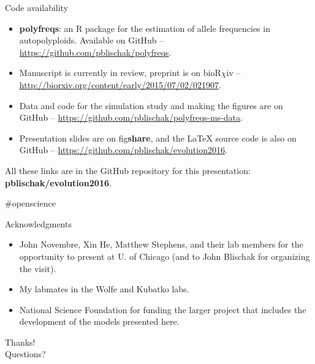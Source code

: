 \documentclass[presentation,sansserif]{beamer}
\begin{document}
\begin{frame}[t,plain]{Code availability}
	\fontsize{10pt}{10}\selectfont
	\begin{itemize}
		\item \textbf{polyfreqs}: an R package for the estimation of allele frequencies in autopolyploids. Available on GitHub -- \url{https://github.com/pblischak/polyfreqs}.
		\vspace{0.2in}

		\item Manuscript is currently in review, preprint is on bioR$\chi$iv -- \url{http://biorxiv.org/content/early/2015/07/02/021907}.
		\vspace{0.2in}

		\item Data and code for the simulation study and making the figures are on GitHub -- \url{https://github.com/pblischak/polyfreqs-ms-data}.
		\vspace{0.2in}

		\item Presentation slides are on fig\textbf{share}, and the \LaTeX{} source code is also on GitHub -- \url{https://github.com/pblischak/evolution2016}.
	\end{itemize}
	\vspace{0.15in}

	{\Large \alert{All these links are in the GitHub repository for this presentation: \textbf{pblischak/evolution2016}.}}

	\hfill {\tiny \#openscience}
\end{frame}

\begin{frame}[t,plain]{Acknowledgments}
  \vspace{0.2in}

  \begin{itemize}
    \setlength\itemsep{0.3in}
    \item John Novembre, Xin He, Matthew Stephens, and their lab members for the opportunity to present at U. of Chicago (and to John Blischak for organizing the visit).
    \item My labmates in the Wolfe and Kubatko labs.
    \item National Science Foundation for funding the larger project that includes the development of the models presented here.
  \end{itemize}

\end{frame}

\begin{frame}[c,plain]{}
	\begin{center}
		{\Huge Thanks!}\\
		\vspace{0.5in}
		{\LARGE Questions?}
	\end{center}
\end{frame}
\end{document}
